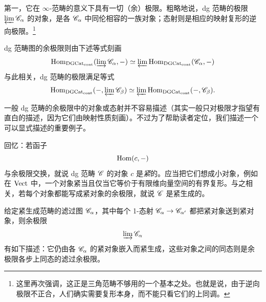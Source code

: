 第一，它在 $\infty$-范畴的意义下具有一切（余）极限。粗略地说，dg 范畴的极限 $\varprojlim \mathscr{C}_\alpha$ 的对象，是各 $\mathscr{C}_\alpha$ 中同伦相容的一族对象；态射则是相应的映射复形的逆向极限。\footnote{这里再次强调，这正是三角范畴不够用的一个基本之处。也就是说，由于逆向极限不正合，人们确实需要复形本身，而不能只看它们的上同调。}

dg 范畴图的余极限则由下述等式刻画
%
\[
\operatorname{Hom}_{\operatorname{DGCat}_{\operatorname{cont}}}(\varinjlim \mathscr{C}_\alpha, -) \simeq \varprojlim
\operatorname{Hom}_{\operatorname{DGCat}_{\operatorname{cont}}}(\mathscr{C}_\alpha, -)
\]
%
与此相关，dg 范畴的极限满足等式
%
\[
 \operatorname{Hom}_{\operatorname{DGCat}_{\operatorname{cont}}}(-, \varprojlim \mathscr{C}_\beta) \simeq \varprojlim
 \operatorname{Hom}_{\operatorname{DGCat}_{\operatorname{cont}}}(-, \mathscr{C}_\beta).
\]
%

一般 dg 范畴的余极限中的对象或态射并不容易描述（其实一般只对极限才指望有直白的描述，因为它们由映射性质刻画）。不过为了帮助读者定位，我们描述一个可以显式描述的重要例子。

\begin{ex}\label{e:colimitcats}回忆：若函子 $$\operatorname{Hom}(c, -)$$ 与余极限交换，就说 dg 范畴 $\mathscr{C}$ 的对象 $c$ 是\emph{紧}的。应当把它们想成小对象，例如在 $\operatorname{Vect}$ 中，一个对象紧当且仅当它等价于有限维向量空间的有界复形。与之相关，若每个对象都能写成紧对象的余极限，就说 $\mathscr{C}$ 是紧生成的。

给定紧生成范畴的滤过图 $\mathscr{C}_\alpha$，其中每个 1-态射 $\mathscr{C}_\alpha \rightarrow \mathscr{C}_{\alpha'}$ 都把紧对象送到紧对象，则余极限
%
\[
  \varinjlim \mathscr{C}_{\alpha}
\]
%
有如下描述：它仍由各 $\mathscr{C}_\alpha$ 的紧对象嵌入而紧生成，这些对象之间的同态则是余极限各步上同态的滤过余极限。
\end{ex}
